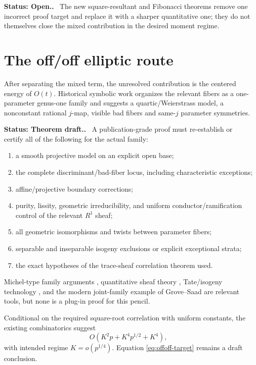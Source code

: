 \documentclass[11pt]{article}
\newcommand{\Status}[1]{\par\smallskip\noindent\textbf{Status: #1.}\ }
\begin{document}
\Status{Open.}  The new square-resultant and Fibonacci theorems remove one
incorrect proof target and replace it with a sharper quantitative one; they do
not themselves close the mixed contribution in the desired moment regime.

\section{The off/off elliptic route}

After separating the mixed term, the unresolved contribution is the centered
energy of $O(t)$.  Historical symbolic work organizes the relevant fibers as a
one-parameter genus-one family and suggests a quartic/Weierstrass model, a
nonconstant rational $j$-map, visible bad fibers and same-$j$ parameter
symmetries.

\Status{Theorem draft.}  A publication-grade proof must re-establish or certify
all of the following for the actual family:
\begin{enumerate}
\item a smooth projective model on an explicit open base;
\item the complete discriminant/bad-fiber locus, including characteristic
      exceptions;
\item affine/projective boundary corrections;
\item purity, lissity, geometric irreducibility, and uniform
      conductor/ramification control of the relevant $R^1$ sheaf;
\item all geometric isomorphisms and twists between parameter fibers;
\item separable and inseparable isogeny exclusions or explicit exceptional
      strata;
\item the exact hypotheses of the trace-sheaf correlation theorem used.
\end{enumerate}

Michel-type family arguments \cite{Michel1995}, quantitative sheaf theory
\cite{SFFK2023}, Tate/isogeny technology \cite{Zarhin2013}, and the modern
joint-family example of Grove--Saad \cite{GroveSaad2025} are relevant tools,
but none is a plug-in proof for this pencil.

Conditional on the required square-root correlation with uniform constants,
the existing combinatorics suggest
\begin{equation}\label{eq:offoff-target}
O\!\left(K^2p+K^4p^{1/2}+K^4\right),
\end{equation}
with intended regime $K=o(p^{1/4})$.  Equation
\eqref{eq:offoff-target} remains a draft conclusion.
\end{document}
